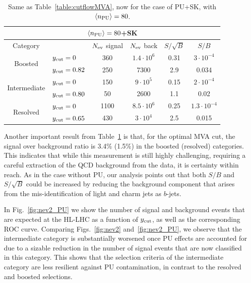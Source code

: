 \begin{table}[t]
  \centering
  \begin{tabular}{|c|l|c|c|c|c|}
        \hline
     \multicolumn{6}{|c|}{$\left\langle n_{\rm PU}\right\rangle=80$+SK} \\
     \hline
         \hline
    Category  &   &  $N_{\rm ev}$ signal &  $N_{\rm ev}$ back  &  $S/\sqrt{B}$ & $S/B$ \\ 
    \hline
    \hline
    \multirow{2}{*}{Boosted} &  $y_{\rm cut}=0$  & 360   &  $1.4\cdot 10^6$ & 0.31   &
     $3\cdot 10^{-4}$  \\
    &  $y_{\rm cut}=0.82$ &  250 & 7300  & 2.9    & 0.034  \\
    \hline
    \hline
    \multirow{2}{*}{Intermediate} &  $y_{\rm cut}=0$  &  150  & $9\cdot 10^5$    & 0.15    &
     $2\cdot 10^{-4}$ \\
    &  $y_{\rm cut}=0.80$ & 50 & 2600  &  1.1   & 0.02 \\
    \hline
    \hline
    \multirow{2}{*}{Resolved} &  $y_{\rm cut}=0$  &  1100  & $8.5\cdot 10^6$
    & 0.25    &  $1.3\cdot 10^{-4}$  \\
    &  $y_{\rm cut}=0.65$ & 430  & $3\cdot 10^4$  &  2.5   & 0.015  \\
    \hline
      \end{tabular}
  \caption{\small Same as Table~\ref{table:cutflowMVA}, now for the case
    of PU+SK, with $\left\langle n_{\rm PU}\right\rangle=80$.
        \label{table:cutflowMVA_PU}
  }
\end{table}

Another important result from Table~\ref{table:cutflowMVA_PU} is that,
for the optimal MVA cut, the signal over background ratio
is 3.4\% (1.5\%)
in the boosted (resolved) categories.
%
This indicates that while this measurement is still highly challenging,
requiring a careful extraction of the QCD
background from the data, it is certainty within reach.
%
As in the case without PU, 
our analysis  points out that both
$S/B$ and $S/\sqrt{B}$ could be increased  by reducing the background component
that arises from the mis-identification of light and charm
jets as $b$-jets.

In Fig.~\ref{fig:nev2_PU}
we show the number of signal and background events that
are expected at the HL-LHC as a function of
$y_{\rm cut}$, as well as the corresponding ROC curve.
%
Comparing Figs.~\ref{fig:nev2} and~\ref{fig:nev2_PU}, we observe
that the intermediate category is substantially worsened once PU effects
are accounted for due to a sizable
reduction in the number of signal
events that are now classified in this category.
%
This shows that the selection criteria
of the intermediate category are less
resilient against PU contamination,
in contrast to the resolved and boosted selections.

